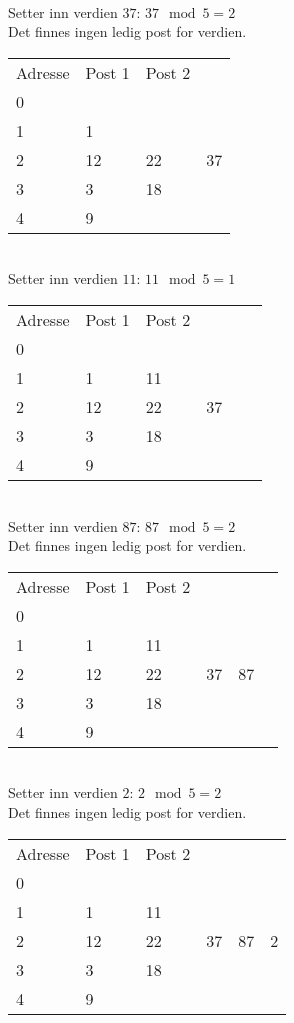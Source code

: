 \documentclass[a4paper, 12pt] {article}
\begin{document}
~\\
Setter inn verdien $37$: $37 \mod 5 = 2$\\
Det finnes ingen ledig post for verdien.\\
\begin{tabular}{|l|l|l|l}
    \hline
    Adresse & Post 1 & Post 2	& ~ \\
    0       & ~      & ~      \\
    1       & 1      & ~      \\
    2       & 12     & 22	& 37 \\
    3       & 3      & 18     \\
    4       & 9      & ~      \\ \hline
\end{tabular}

~\\
Setter inn verdien $11$: $11 \mod 5 = 1$\\
\begin{tabular}{|l|l|l|lll}
    \hline
    Adresse & Post 1 & Post 2	& ~ \\
    0       & ~      & ~      \\
    1       & 1      & 11      \\
    2       & 12     & 22	& 37 \\
    3       & 3      & 18     \\
    4       & 9      & ~      \\ \hline
\end{tabular}


~\\
Setter inn verdien $87$: $87 \mod 5 = 2$\\
Det finnes ingen ledig post for verdien.\\
\begin{tabular}{|l|l|l|lll}
    \hline
    Adresse & Post 1 & Post 2	& ~ \\
    0       & ~      & ~      \\
    1       & 1      & 11      \\
    2       & 12     & 22	& 37	&   87 \\
    3       & 3      & 18     \\
    4       & 9      & ~      \\ \hline
\end{tabular}

~\\
Setter inn verdien $2$: $2 \mod 5 = 2$\\
Det finnes ingen ledig post for verdien.\\
\begin{tabular}{|l|l|l|lll}
    \hline
    Adresse & Post 1 & Post 2	& ~ \\
    0       & ~      & ~      \\
    1       & 1      & 11      \\
    2       & 12     & 22	& 37	&   87	&   2\\
    3       & 3      & 18     \\
    4       & 9      & ~      \\ \hline
\end{tabular}
\end{document}
